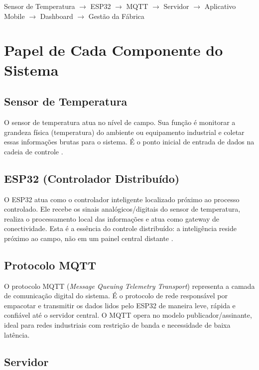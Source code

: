 \documentclass[12pt,a4paper,oneside]{article}
\begin{document}
\begin{center}
  Sensor de Temperatura $\rightarrow$ ESP32 $\rightarrow$ MQTT $\rightarrow$ Servidor $\rightarrow$ Aplicativo Mobile $\rightarrow$ Dashboard $\rightarrow$ Gestão da Fábrica
\end{center}

\section{Papel de Cada Componente do Sistema}

\subsection{Sensor de Temperatura}

O sensor de temperatura atua no nível de campo. Sua função é monitorar a grandeza física (temperatura) do ambiente ou equipamento industrial e coletar essas informações brutas para o sistema. É o ponto inicial de entrada de dados na cadeia de controle \cite{lara2021}.

\subsection{ESP32 (Controlador Distribuído)}

O ESP32 atua como o controlador inteligente localizado próximo ao processo controlado. Ele recebe os sinais analógicos/digitais do sensor de temperatura, realiza o processamento local das informações e atua como gateway de conectividade. Esta é a essência do controle distribuído: a inteligência reside próximo ao campo, não em um painel central distante \cite{albuquerque2009}.

\subsection{Protocolo MQTT}

O protocolo MQTT (\textit{Message Queuing Telemetry Transport}) representa a camada de comunicação digital do sistema. É o protocolo de rede responsável por empacotar e transmitir os dados lidos pelo ESP32 de maneira leve, rápida e confiável até o servidor central. O MQTT opera no modelo publicador/assinante, ideal para redes industriais com restrição de banda e necessidade de baixa latência.

\subsection{Servidor}
\end{document}
